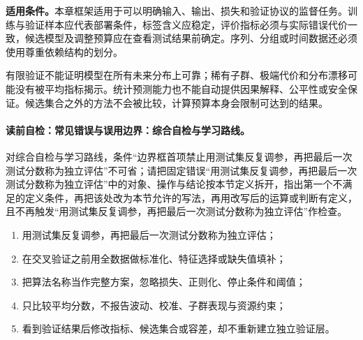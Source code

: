 \begin{applicabilitybox}
\textbf{适用条件。}本章框架适用于可以明确输入、输出、损失和验证协议的监督任务。训练与验证样本应代表部署条件，标签含义应稳定，评价指标必须与实际错误代价一致，候选模型及调整预算应在查看测试结果前确定。序列、分组或时间数据还必须使用尊重依赖结构的划分。
\end{applicabilitybox}

\label{struct:V3-C07-CH29}
\begin{notapplicablebox}[title=\SLMethodLimitationsTitle]
有限验证不能证明模型在所有未来分布上可靠；稀有子群、极端代价和分布漂移可能没有被平均指标揭示。统计预测能力也不能自动提供因果解释、公平性或安全保证。候选集合之外的方法不会被比较，计算预算本身会限制可达到的结果。
\end{notapplicablebox}

\label{struct:V3-C07-CH30}
\paragraph{读前自检：常见错误与误用边界：综合自检与学习路线。}对综合自检与学习路线，条件“边界框首项禁止用测试集反复调参，再把最后一次测试分数称为独立评估”不可省；请把固定错误“用测试集反复调参，再把最后一次测试分数称为独立评估”中的对象、操作与结论按本节定义拆开，指出第一个不满足的定义条件，再把该处改为本节允许的写法，再用改写后的运算或判断有定义，且不再触发“用测试集反复调参，再把最后一次测试分数称为独立评估”作检查。\par

\begin{warningbox}
\begin{enumerate}[leftmargin=2.2em]
  \item 用测试集反复调参，再把最后一次测试分数称为独立评估；
  \item 在交叉验证之前用全数据做标准化、特征选择或缺失值填补；
  \item 把算法名称当作完整方案，忽略损失、正则化、停止条件和阈值；
  \item 只比较平均分数，不报告波动、校准、子群表现与资源约束；
  \item 看到验证结果后修改指标、候选集合或容差，却不重新建立独立验证层。
\end{enumerate}
\end{warningbox}

